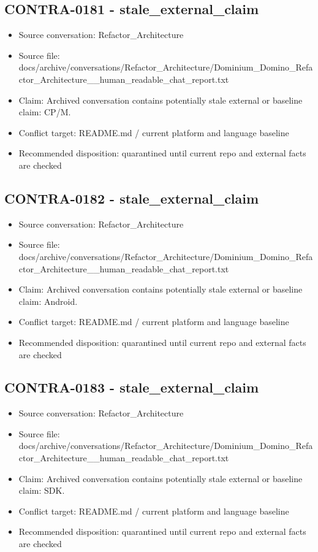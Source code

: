 \documentclass[11pt,a4paper]{report}
\begin{document}
\subsection{CONTRA-0181 - stale\_external\_claim}

\begin{itemize}
\item Source conversation: Refactor\_Architecture
\item Source file: docs/archive/conversations/Refactor\_Architecture/Dominium\_Domino\_Refactor\_Architecture\_\_human\_readable\_chat\_report.txt
\item Claim: Archived conversation contains potentially stale external or baseline claim: CP/M.
\item Conflict target: README.md / current platform and language baseline
\item Recommended disposition: quarantined until current repo and external facts are checked
\end{itemize}

\subsection{CONTRA-0182 - stale\_external\_claim}

\begin{itemize}
\item Source conversation: Refactor\_Architecture
\item Source file: docs/archive/conversations/Refactor\_Architecture/Dominium\_Domino\_Refactor\_Architecture\_\_human\_readable\_chat\_report.txt
\item Claim: Archived conversation contains potentially stale external or baseline claim: Android.
\item Conflict target: README.md / current platform and language baseline
\item Recommended disposition: quarantined until current repo and external facts are checked
\end{itemize}

\subsection{CONTRA-0183 - stale\_external\_claim}

\begin{itemize}
\item Source conversation: Refactor\_Architecture
\item Source file: docs/archive/conversations/Refactor\_Architecture/Dominium\_Domino\_Refactor\_Architecture\_\_human\_readable\_chat\_report.txt
\item Claim: Archived conversation contains potentially stale external or baseline claim: SDK.
\item Conflict target: README.md / current platform and language baseline
\item Recommended disposition: quarantined until current repo and external facts are checked
\end{itemize}
\end{document}
